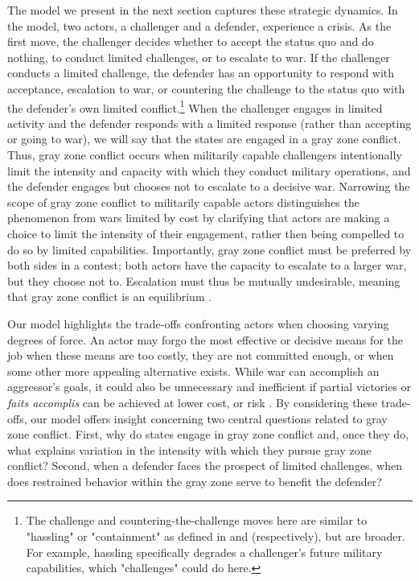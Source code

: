 \documentclass[bibtex, autowc]{apsr_submission}
\begin{document}
The model we present in the next section captures these strategic dynamics. In the model, two actors, a challenger and a defender, experience a crisis. As the first move, the challenger decides whether to accept the status quo and do nothing, to conduct limited challenges, or to escalate to war. If the challenger conducts a limited challenge, the defender has an opportunity to respond with acceptance, escalation to war, or countering the challenge to the status quo with the defender's own limited conflict.\footnote{The challenge and countering-the-challenge moves here are similar to "hassling" or "containment" as defined in \citet{schram_hasslinghowstates_2020} and \citet{joseph_littlebitcheaptalk_2020} (respectively), but are broader. For example, hassling specifically degrades a challenger's future military capabilities, which "challenges" could do here.} When the challenger engages in limited activity and the defender responds with a limited response (rather than accepting or going to war), we will say that the states are engaged in a gray zone conflict. Thus, gray zone conflict occurs when militarily capable challengers intentionally limit the intensity and capacity with which they conduct military operations, and the defender engages but chooses not to escalate to a decisive war. Narrowing the scope of gray zone conflict to militarily capable actors distinguishes the phenomenon from wars limited by cost by clarifying that actors are making a choice to limit the intensity of their engagement, rather then being compelled to do so by limited capabilities. Importantly, gray zone conflict must be preferred by both sides in a contest; both actors have the capacity to escalate to a larger war, but they choose not to. Escalation must thus be mutually undesirable, meaning that gray zone conflict is an equilibrium \citep{carson_facingsavingface_2016, carson_secretwarscovert_2018}.

Our model highlights the trade-offs confronting actors when choosing varying degrees of force. An actor may forgo the most effective or decisive means for the job when these means are too costly, they are not committed enough, or when some other more appealing alternative exists. While war can accomplish an aggressor’s goals, it could also be unnecessary and inefficient if partial victories or \textit{faits accomplis} can be achieved at lower cost, or risk \citep{altman_advancingattackingstrategic_2018}. By considering these trade-offs, our model offers insight concerning two central questions related to gray zone conflict. First, why do states engage in gray zone conflict and, once they do, what explains variation in the intensity with which they pursue gray zone conflict? Second, when a defender faces the prospect of limited challenges, when does restrained behavior within the gray zone serve to benefit the defender?
\end{document}
